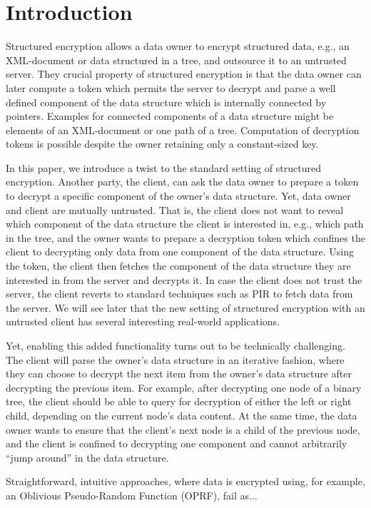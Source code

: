 \section{Introduction}
Structured encryption allows a data owner to encrypt structured data,
e.g., an XML-document or data structured in a tree, and outsource it to an untrusted
server.  They crucial property of structured encryption is that the
data owner can later compute a token which permits the server to
decrypt and parse a well defined component of the data structure which is internally connected by pointers.
Examples for connected components of a data structure might be
elements of an XML-document or one path of a
tree. Computation of decryption tokens is possible despite the owner retaining
only a constant-sized key.

In this paper, we introduce a twist to the standard setting of
structured encryption. Another party, the client, can ask the data
owner to prepare a token to decrypt a specific component of the owner's
data structure. Yet, data owner and client are mutually
untrusted. That is, the client does not want to reveal which component of
the data structure the client is interested in, e.g., which path in
the tree, and the owner wants to prepare a decryption token which
confines the client to decrypting only data from one component of the data
structure. Using the token, the client then fetches the component of 
the data structure they are interested in from the server and decrypts
it. In case the client does not trust the server, the client reverts
to standard techniques such as PIR to fetch data from the server. We
will see later that the new setting of structured encryption with an
untrusted client has several interesting real-world applications.

Yet, enabling this added functionality turns out to be technically
challenging. The client will parse the owner's data structure in an
iterative fashion, where they can choose to decrypt the next item from
the owner's data structure after decrypting the previous item.  For
example, after decrypting one node of a binary tree, the client should
be able to query for decryption of either the left or right child,
depending on the current node's data content.  At the same time, the
data owner wants to ensure that the client's next node is a child of
the previous node, and the client is confined to decrypting one component and cannot arbitrarily ``jump around'' in
the data structure.

Straightforward, intuitive approaches, where data
is encrypted using, for example, an Oblivious Pseudo-Random Function
(OPRF), fail as...

